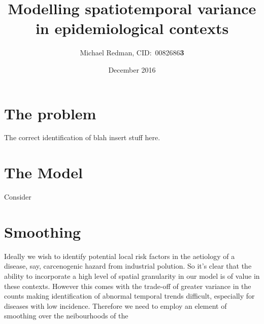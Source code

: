 \documentclass{article}
\begin{document}
\title{Modelling spatiotemporal variance in epidemiological contexts}
\author{Michael Redman, CID:\ 0082686\textbf{3}}
\date{December 2016}

\maketitle

\section{The problem}

The correct identification of blah insert stuff here.

\section{The Model}

Consider

\section{Smoothing}

Ideally we wish to identify potential local risk factors in the aetiology of a disease, say, carcenogenic hazard from industrial polution. So it's clear that the ability to incorporate a high level of spatial granularity in our model is of value in these contexts. However this comes with the trade-off of greater variance in the counts making identification of abnormal temporal trends difficult, especially for diseases with low incidence. Therefore we need to employ an element of smoothing over the neibourhoods of the 
\end{document}
